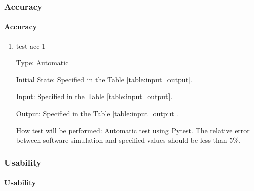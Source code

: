\documentclass[12pt, titlepage]{article}
\begin{document}


\subsubsection{Accuracy}

\paragraph{Accuracy}

\begin{enumerate}

  \item{test-acc-1\\}

        Type: Automatic

        Initial State: Specified in the \hyperref[table:input_output]{Table \ref*{table:input_output}}.

        Input: Specified in the \hyperref[table:input_output]{Table \ref*{table:input_output}}.

        Output: Specified in the \hyperref[table:input_output]{Table \ref*{table:input_output}}.

        How test will be performed:
        Automatic test using Pytest.
        The relative error between software simulation and specified values should be less than $5\%$.
\end{enumerate}

\subsubsection{Usability}

\paragraph{Usability}
\end{document}
